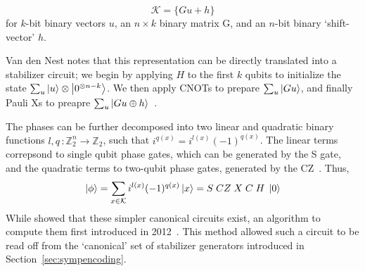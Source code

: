 \[
    \mathcal{K}=\{Gu + h\}
\]
for $k$-bit binary vectors $u$, an $n\times k$ binary matrix G, and an $n$-bit binary `shift-vector' $h$.\par
Van den Nest notes that this representation can be directly translated into a stabilizer circuit; we begin by applying $H$ to the first $k$ qubits to initialize the state $\sum_{u}\ket{u}\otimes\ket{0^{\otimes n-k}}$. We then apply CNOTs to prepare $\sum_{u}\ket{Gu}$, and finally Pauli Xs to preapre $\sum_{u}\ket{Gu\oplus h}$~\cite{VandenNest2008}.\par
The phases can be further decomposed into two linear and quadratic binary functions $l,q\,:\mathbb{Z}_{2}^{n}\rightarrow\mathbb{Z}_{2}$, such that $i^{q(x)}=i^{l(x)}(-1)^{q(x)}$. The linear terms correpsond to single qubit phase gates, which can be generated by the S gate, and the quadratic terms to two-qubit phase gates, generated by the CZ~\cite{VandenNest2008}. Thus,
\begin{equation}
\ket{\phi}=\sum_{x\in\mathcal{K}}i^{l(x)}(-1)^{q(x)}\ket{x} = S\;CZ\;X\;C\;H\;\ket{0}
\label{eq:expandedaffinecirc}
\end{equation}
While \cite{VandenNest2008} showed that these simpler canonical circuits exist, an algorithm to compute them first introduced in 2012~\cite{Garcia2012}. This method allowed such a circuit to be read off from the `canonical' set of stabilizer generators introduced in Section~\ref{sec:sympencoding}. 
